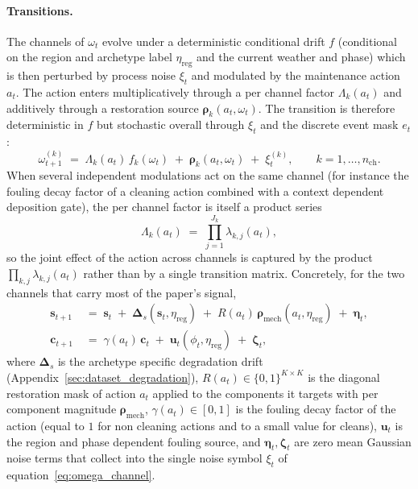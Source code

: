 \paragraph{Transitions.}
The channels of $\omega_t$ evolve under a deterministic conditional drift $f$ (conditional on the region and archetype label $\eta_\mathrm{reg}$ and the current weather and phase) which is then perturbed by process noise $\xi_t$ and modulated by the maintenance action $a_t$. The action enters multiplicatively through a per channel factor $\Lambda_k(a_t)$ and additively through a restoration source $\boldsymbol{\rho}_k(a_t, \omega_t)$. The transition is therefore deterministic in $f$ but stochastic overall through $\xi_t$ and the discrete event mask $e_t$:
\begin{equation}
    \omega^{(k)}_{t+1} \;=\; \Lambda_k(a_t)\,f_k(\omega_t) \;+\; \boldsymbol{\rho}_k(a_t, \omega_t) \;+\; \xi^{(k)}_t,
    \qquad k = 1, \ldots, n_\mathrm{ch}.
    \label{eq:omega_channel}
\end{equation}
When several independent modulations act on the same channel (for instance the fouling decay factor of a cleaning action combined with a context dependent deposition gate), the per channel factor is itself a product series
\begin{equation}
    \Lambda_k(a_t) \;=\; \prod_{j=1}^{J_k} \lambda_{k,j}(a_t),
    \label{eq:Lambda_prod}
\end{equation}
so the joint effect of the action across channels is captured by the product $\prod_{k,j} \lambda_{k,j}(a_t)$ rather than by a single transition matrix. Concretely, for the two channels that carry most of the paper's signal,
\begin{align}
    \mathbf{s}_{t+1} &\;=\; \mathbf{s}_t \;+\; \boldsymbol{\Delta}_{\!s}(\mathbf{s}_t, \eta_\mathrm{reg}) \;+\; R(a_t)\,\boldsymbol{\rho}_\mathrm{mech}(a_t, \eta_\mathrm{reg}) \;+\; \boldsymbol{\eta}_t, \\
    \mathbf{c}_{t+1} &\;=\; \gamma(a_t)\,\mathbf{c}_t \;+\; \mathbf{u}_t(\phi_t, \eta_\mathrm{reg}) \;+\; \boldsymbol{\zeta}_t,
\end{align}
where $\boldsymbol{\Delta}_{\!s}$ is the archetype specific degradation drift (Appendix~\ref{sec:dataset_degradation}), $R(a_t) \in \{0,1\}^{K \times K}$ is the diagonal restoration mask of action $a_t$ applied to the components it targets with per component magnitude $\boldsymbol{\rho}_\mathrm{mech}$, $\gamma(a_t) \in [0,1]$ is the fouling decay factor of the action (equal to $1$ for non cleaning actions and to a small value for cleans), $\mathbf{u}_t$ is the region and phase dependent fouling source, and $\boldsymbol{\eta}_t, \boldsymbol{\zeta}_t$ are zero mean Gaussian noise terms that collect into the single noise symbol $\xi_t$ of equation~\ref{eq:omega_channel}.

